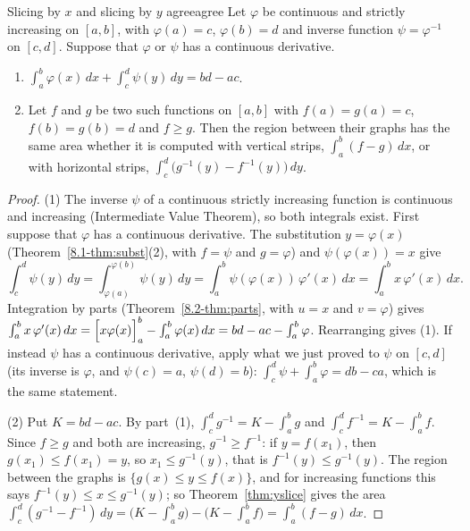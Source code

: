 \documentclass[11pt]{article}
\begin{document}
\begin{thm}{Slicing by $x$ and slicing by $y$ agree}{agree}
Let $\varphi$ be continuous and strictly increasing on $[a,b]$, with $\varphi(a)=c$, $\varphi(b)=d$ and inverse function $\psi=\varphi^{-1}$ on $[c,d]$. Suppose that $\varphi$ or $\psi$ has a continuous derivative.
\begin{enumerate}[label=(\arabic*),nosep]
  \item $\displaystyle\int_a^b\varphi(x)\,dx+\int_c^d\psi(y)\,dy=bd-ac$.
  \item Let $f$ and $g$ be two such functions on $[a,b]$ with $f(a)=g(a)=c$, $f(b)=g(b)=d$ and $f\ge g$. Then the region between their graphs has the same area whether it is computed with vertical strips, $\int_a^b(f-g)\,dx$, or with horizontal strips, $\int_c^d\bigl(g^{-1}(y)-f^{-1}(y)\bigr)\,dy$.
\end{enumerate}
\end{thm}
\begin{proof}
(1) The inverse $\psi$ of a continuous strictly increasing function is continuous and increasing (Intermediate Value Theorem), so both integrals exist. First suppose that $\varphi$ has a continuous derivative. The substitution $y=\varphi(x)$ (Theorem~\ref{8.1-thm:subst}(2), with $f=\psi$ and $g=\varphi$) and $\psi(\varphi(x))=x$ give
\[
\int_c^d\psi(y)\,dy=\int_{\varphi(a)}^{\varphi(b)}\psi(y)\,dy=\int_a^b\psi(\varphi(x))\,\varphi'(x)\,dx=\int_a^bx\,\varphi'(x)\,dx .
\]
Integration by parts (Theorem~\ref{8.2-thm:parts}, with $u=x$ and $v=\varphi$) gives $\int_a^bx\,\varphi'(x)\,dx=\Bigl[x\varphi(x)\Bigr]_a^b-\int_a^b\varphi(x)\,dx=bd-ac-\int_a^b\varphi$. Rearranging gives (1). If instead $\psi$ has a continuous derivative, apply what we just proved to $\psi$ on $[c,d]$ (its inverse is $\varphi$, and $\psi(c)=a$, $\psi(d)=b$): $\int_c^d\psi+\int_a^b\varphi=db-ca$, which is the same statement.

(2) Put $K=bd-ac$. By part~(1), $\int_c^dg^{-1}=K-\int_a^bg$ and $\int_c^df^{-1}=K-\int_a^bf$. Since $f\ge g$ and both are increasing, $g^{-1}\ge f^{-1}$: if $y=f(x_1)$, then $g(x_1)\le f(x_1)=y$, so $x_1\le g^{-1}(y)$, that is $f^{-1}(y)\le g^{-1}(y)$. The region between the graphs is $\{g(x)\le y\le f(x)\}$, and for increasing functions this says $f^{-1}(y)\le x\le g^{-1}(y)$; so Theorem~\ref{thm:yslice} gives the area $\int_c^d(g^{-1}-f^{-1})\,dy=\bigl(K-\int_a^bg\bigr)-\bigl(K-\int_a^bf\bigr)=\int_a^b(f-g)\,dx$.
\end{proof}
\end{document}

